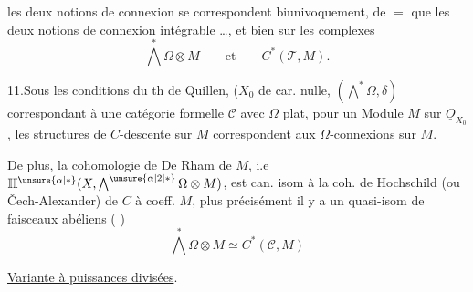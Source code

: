 les deux notions de connexion se correspondent biunivoquement, de $=$ que les deux notions de  connexion intégrable \ldots, et bien sur les complexes
\[
\bigwedge^*\Omega\otimes M\qquad\text{et}\qquad C^*(\mathscr T,M).
\]

11.\quad Sous les conditions du th de Quillen, ($X_0$ de car. nulle,  $(\bigwedge^*\Omega,\delta)$  correspondant à une catégorie formelle $\mathcal C$ avec $\Omega$ plat, pour un Module $M$ sur $\underline O_{X_0}$, les structures de $C$-descente sur $M$ correspondent aux  $\Omega$-connexions sur $M$.


De plus, la cohomologie de De Rham de $M$, i.e $\mathbb H^{\unsure{\alpha|*}}(X,\bigwedge^{\unsure{\alpha|2|*}}\Omega\otimes M)$, est can. isom à la coh. de Hochschild (ou Čech-Alexander) de $C$ à coeff.  $M$, plus précisément il y a un quasi-isom  de  faisceaux abéliens ( )
\[
\bigwedge^*\Omega\otimes M\simeq C^*(\mathcal C,M)
\]

\uline{Variante à puissances divisées}.

